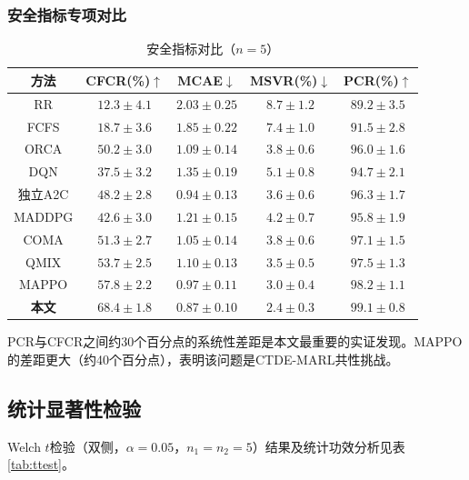 \documentclass[12pt,a4paper,UTF8]{ctexart}
\begin{document}
\subsubsection{安全指标专项对比}

\begin{table}[H]
    \centering
    \caption{安全指标对比（$n=5$）}
    \label{tab:safety}
    \begin{tabular}{|c|c|c|c|c|}
        \hline
        \textbf{方法} & \textbf{CFCR(\%)$\uparrow$} & \textbf{MCAE$\downarrow$} & \textbf{MSVR(\%)$\downarrow$} & \textbf{PCR(\%)$\uparrow$} \\
        \hline
        RR & $12.3\pm4.1$ & $2.03\pm0.25$ & $8.7\pm1.2$ & $89.2\pm3.5$ \\
        FCFS & $18.7\pm3.6$ & $1.85\pm0.22$ & $7.4\pm1.0$ & $91.5\pm2.8$ \\
        ORCA & $50.2\pm3.0$ & $1.09\pm0.14$ & $3.8\pm0.6$ & $96.0\pm1.6$ \\
        DQN & $37.5\pm3.2$ & $1.35\pm0.19$ & $5.1\pm0.8$ & $94.7\pm2.1$ \\
        独立A2C & $48.2\pm2.8$ & $0.94\pm0.13$ & $3.6\pm0.6$ & $96.3\pm1.7$ \\
        MADDPG & $42.6\pm3.0$ & $1.21\pm0.15$ & $4.2\pm0.7$ & $95.8\pm1.9$ \\
        COMA & $51.3\pm2.7$ & $1.05\pm0.14$ & $3.8\pm0.6$ & $97.1\pm1.5$ \\
        QMIX & $53.7\pm2.5$ & $1.10\pm0.13$ & $3.5\pm0.5$ & $97.5\pm1.3$ \\
        MAPPO & $57.8\pm2.2$ & $0.97\pm0.11$ & $3.0\pm0.4$ & $98.2\pm1.1$ \\
        \textbf{本文} & $\mathbf{68.4\pm1.8}$ & $\mathbf{0.87\pm0.10}$ & $\mathbf{2.4\pm0.3}$ & $\mathbf{99.1\pm0.8}$ \\
        \hline
    \end{tabular}
\end{table}

PCR与CFCR之间约30个百分点的系统性差距是本文最重要的实证发现。MAPPO的差距更大（约40个百分点），表明该问题是CTDE-MARL共性挑战。

\subsection{统计显著性检验}

Welch $t$检验（双侧，$\alpha=0.05$，$n_1=n_2=5$）结果及统计功效分析见表\ref{tab:ttest}。
\end{document}
